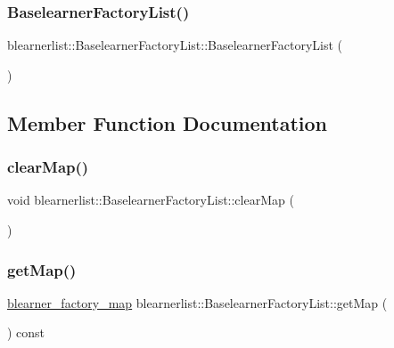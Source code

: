 \subsubsection{\texorpdfstring{Baselearner\+Factory\+List()}{BaselearnerFactoryList()}}
{\footnotesize\ttfamily blearnerlist\+::\+Baselearner\+Factory\+List\+::\+Baselearner\+Factory\+List (\begin{DoxyParamCaption}{ }\end{DoxyParamCaption})}



\subsection{Member Function Documentation}
\mbox{\label{classblearnerlist_1_1_baselearner_factory_list_aacbe97968ca672d2481d5f8dce0bbf94}} 
\subsubsection{\texorpdfstring{clear\+Map()}{clearMap()}}
{\footnotesize\ttfamily void blearnerlist\+::\+Baselearner\+Factory\+List\+::clear\+Map (\begin{DoxyParamCaption}{ }\end{DoxyParamCaption})}

\mbox{\label{classblearnerlist_1_1_baselearner_factory_list_aeb573190a689af611e2f80ca8ed65d95}} 
\subsubsection{\texorpdfstring{get\+Map()}{getMap()}}
{\footnotesize\ttfamily \hyperlink{baselearner__factory__list_8h_a058570e00ae11b882cfed36eb40be025}{blearner\+\_\+factory\+\_\+map} blearnerlist\+::\+Baselearner\+Factory\+List\+::get\+Map (\begin{DoxyParamCaption}{ }\end{DoxyParamCaption}) const}

